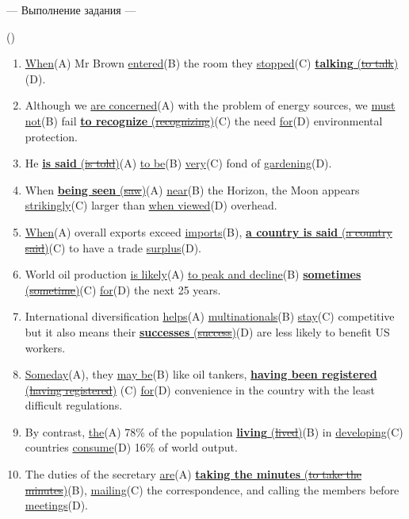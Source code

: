 \documentclass[main.tex]{subfiles}
\begin{document}



\hypertarget{ltask:2024-04-10-1}{--- Выполнение задания ---} (\hyperref[task:2024-04-03-2]{\color{blue}{перейти к тексту задания}})
\\


\begin{enumerate}[nosep,leftmargin=*]
	\itemsep\eitsp
	\item \uline{When}(A) Mr Brown \uline{entered}(B) the room they \uline{stopped}(C) \uline{\textbf{talking} (\sout{to talk})}(D).
	\item Although we \uline{are concerned}(A) with the problem of energy sources, we \uline{must not}(B) fail \uline{\textbf{to recognize} (\sout{recognizing})}(C) the need \uline{for}(D) environmental protection.
	\item He \uline{\textbf{is said} (\sout{is told})}(A) \uline{to be}(B) \uline{very}(C) fond of \uline{gardening}(D).
	\item When \uline{\textbf{being seen} (\sout{saw})}(A) \uline{near}(B) the Horizon, the Moon appears \uline{strikingly}(C) larger than \uline{when viewed}(D) overhead.
	\item \uline{When}(A) overall exports exceed \uline{imports}(B), \uline{\textbf{a country is said} (\sout{a country said})}(C) to have a trade \uline{surplus}(D).
	\item World oil production \uline{is likely}(A) \uline{to peak and decline}(B) \uline{\textbf{sometimes} (\sout{sometime})}(C) \uline{for}(D) the next 25 years.
	\item International diversification \uline{helps}(A) \uline{multinationals}(B) \uline{stay}(C) competitive but it also means their \uline{\textbf{successes} (\sout{success})}(D) are less likely to benefit US workers.
	\item \uline{Someday}(A), they \uline{may be}(B) like oil tankers, \uline{\textbf{having been registered} (\sout{having registered})} (C) \uline{for}(D) convenience in the country with the least difficult regulations.
	\item By contrast, \uline{the}(A) 78\% of the population \uline{\textbf{living} (\sout{lived})}(B) in \uline{developing}(C) countries \uline{consume}(D) 16\% of world output.
	\item The duties of the secretary \uline{are}(A) \uline{\textbf{taking the minutes} (\sout{to take the minutes})}(B), \uline{mailing}(C) the correspondence, and calling the members before \uline{meetings}(D).
\end{enumerate}
\ 
\end{document}

